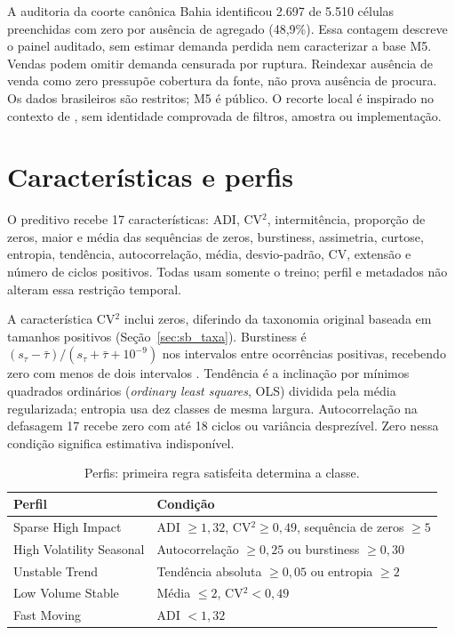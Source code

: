 A auditoria da coorte canônica Bahia identificou 2.697 de 5.510 células preenchidas com zero por ausência de agregado (48,9\%). Essa contagem descreve o painel auditado, sem estimar demanda perdida nem caracterizar a base M5. Vendas podem omitir demanda censurada por ruptura. Reindexar ausência de venda como zero pressupõe cobertura da fonte, não prova ausência de procura. Os dados brasileiros são restritos; M5 é público. O recorte local é inspirado no contexto de \citet{Zabraoui2025GaDQN}, sem identidade comprovada de filtros, amostra ou implementação.

\section{Características e perfis}
\label{sec:carac_series}
O preditivo recebe 17 características: ADI, CV$^2$, intermitência, proporção de zeros, maior e média das sequências de zeros, burstiness, assimetria, curtose, entropia, tendência, autocorrelação, média, desvio-padrão, CV, extensão e número de ciclos positivos. Todas usam somente o treino; perfil e metadados não alteram essa restrição temporal.

A característica CV$^2$ inclui zeros, diferindo da taxonomia original baseada em tamanhos positivos (Seção~\ref{sec:sb_taxa}). Burstiness é $(s_\tau-\bar\tau)/(s_\tau+\bar\tau+10^{-9})$ nos intervalos entre ocorrências positivas, recebendo zero com menos de dois intervalos \citep{GohBarabasi2008Burstiness}. Tendência é a inclinação por mínimos quadrados ordinários (\textit{ordinary least squares}, OLS) dividida pela média regularizada; entropia usa dez classes de mesma largura. Autocorrelação na defasagem 17 recebe zero com até 18 ciclos ou variância desprezível. Zero nessa condição significa estimativa indisponível.

\begin{table}[htbp]\centering\small
\caption{Perfis: primeira regra satisfeita determina a classe.}\label{tab:pod}
\begin{tabular}{@{}p{4.2cm}p{8.2cm}@{}}\toprule
Perfil & Condição\\\midrule
Sparse High Impact & ADI $\geq1{,}32$, CV$^2\geq0{,}49$, sequência de zeros $\geq5$\\
High Volatility Seasonal & Autocorrelação $\geq0{,}25$ ou burstiness $\geq0{,}30$\\
Unstable Trend & Tendência absoluta $\geq0{,}05$ ou entropia $\geq2$\\
Low Volume Stable & Média $\leq2$, CV$^2<0{,}49$\\
Fast Moving & ADI $<1{,}32$\\\bottomrule
\end{tabular}\end{table}

